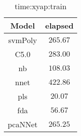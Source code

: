 \begin{table}[!ht]
	\centering
	\begin{tabular}{|c|c|}
		\hline
		Model & elapsed \\ \hline
		svmPoly & $265.67$ \\ \hline
		C5.0 & $283.00$ \\ \hline
		nb & $108.03$ \\ \hline
		nnet & $422.86$ \\ \hline
		pls & $20.07$ \\ \hline
		fda & $56.67$ \\ \hline
		pcaNNet & $265.25$ \\ \hline
	\end{tabular}
	\caption{time:xyap:train}
	\label{tab:time:xyap:train}
\end{table}

